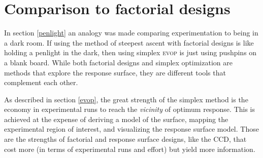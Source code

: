 \section{Comparison to factorial designs}
In section \ref{penlight} an analogy was made comparing experimentation to being in a dark room.  If using the method of steepest ascent with factorial designs is like holding a penlight in the dark, then using simplex \textsc{evop} is just using pushpins on a blank board.  While both factorial designs and simplex optimization are methods that explore the response surface, they are different tools that complement each other.  

As described in section \ref{evop}, the great strength of the simplex method is the economy in experimental runs to reach the \textit{vicinity} of  optimum response.  This is achieved at the expense of deriving a model of the surface, mapping the experimental region of interest, and visualizing the response surface model.  Those are the strengths of factorial and response surface designs, like the CCD, that cost more (in terms of experimental runs and effort) but yield more information.